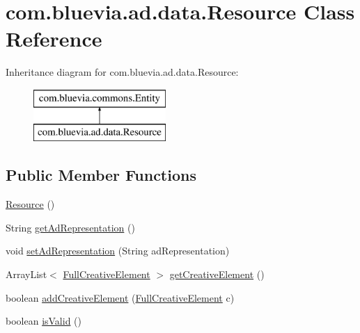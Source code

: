 \hypertarget{classcom_1_1bluevia_1_1ad_1_1data_1_1Resource}{
\section{com.bluevia.ad.data.Resource Class Reference}
\label{classcom_1_1bluevia_1_1ad_1_1data_1_1Resource}
}
Inheritance diagram for com.bluevia.ad.data.Resource:\begin{figure}[H]
\begin{center}
\leavevmode
\includegraphics[height=2.000000cm]{classcom_1_1bluevia_1_1ad_1_1data_1_1Resource}
\end{center}
\end{figure}
\subsection*{Public Member Functions}
\begin{DoxyCompactItemize}
\item 
\hyperlink{classcom_1_1bluevia_1_1ad_1_1data_1_1Resource_ae1eee7c892b7690655fe9e4f7d082792}{Resource} ()
\item 
String \hyperlink{classcom_1_1bluevia_1_1ad_1_1data_1_1Resource_abdc9b8b0f09360188b3412bd1e1cb45d}{getAdRepresentation} ()
\item 
void \hyperlink{classcom_1_1bluevia_1_1ad_1_1data_1_1Resource_aa2013b9b7a5585e9aa4efd5ec7972aa3}{setAdRepresentation} (String adRepresentation)
\item 
ArrayList$<$ \hyperlink{classcom_1_1bluevia_1_1ad_1_1data_1_1FullCreativeElement}{FullCreativeElement} $>$ \hyperlink{classcom_1_1bluevia_1_1ad_1_1data_1_1Resource_a55583fd5df2bcc884b43e07e58c0b0d1}{getCreativeElement} ()
\item 
boolean \hyperlink{classcom_1_1bluevia_1_1ad_1_1data_1_1Resource_a8553db131a6d66258a2e7dcfb445d3fd}{addCreativeElement} (\hyperlink{classcom_1_1bluevia_1_1ad_1_1data_1_1FullCreativeElement}{FullCreativeElement} c)
\item 
boolean \hyperlink{classcom_1_1bluevia_1_1ad_1_1data_1_1Resource_ad6b54fa4245854cc434525be45cc231d}{isValid} ()
\end{DoxyCompactItemize}


